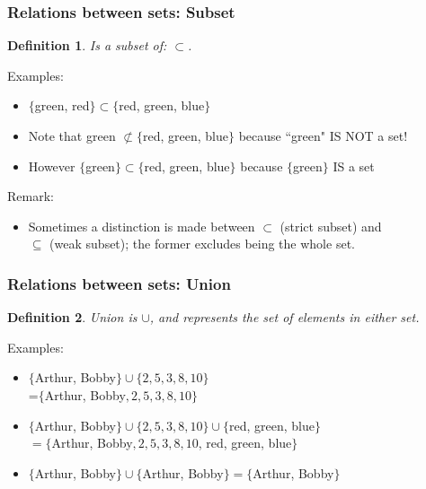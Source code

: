 \documentclass[aspectratio=169, handout]{beamer}
\newtheorem{defn}{Definition}
\numberwithin{equation}{section}
\begin{document}
\begin{frame}
\frametitle{Relations between sets: Subset}

\begin{defn}
Is a subset of: $\subset$.
\end{defn}
\pause

{Examples: }
\begin{itemize}
\item $\{$green, red$\} \subset \{$red, green, blue$\}$ \pause
\item Note that green $\not\subset \{$red, green, blue$\}$ because ``green" IS NOT a set! \pause
\item However $\{$green$\}\subset \{$red, green, blue$\}$ because $\{$green$\}$ IS a set \pause
\end{itemize}

{Remark: }
\begin{itemize}
\item Sometimes a distinction is made between $\subset$ (strict subset) and \\ $\subseteq$ (weak subset); the former excludes being the whole set.
\end{itemize}

\end{frame}



\begin{frame}
\frametitle{Relations between sets: Union}

\begin{defn}
Union is $\cup$, and represents the set of elements in \textit{either} set.
\end{defn}
\pause

{Examples: }
\begin{itemize}
\item $\{$Arthur, Bobby$\} \cup \{2, 5, 3, 8, 10\}$ \\ =$\{$Arthur, Bobby$, 2, 5, 3, 8, 10\}$ \pause
\item $\{$Arthur, Bobby$\} \cup \{2, 5, 3, 8, 10\} \cup \{$red, green, blue$\}$ \\ $=\{$Arthur, Bobby$, 2, 5, 3, 8, 10$, red, green, blue$\}$ \pause
\item $\{$Arthur, Bobby$\} \cup \{$Arthur, Bobby$\} =\{$Arthur, Bobby$\}$
\end{itemize}

\end{frame}
\end{document}
